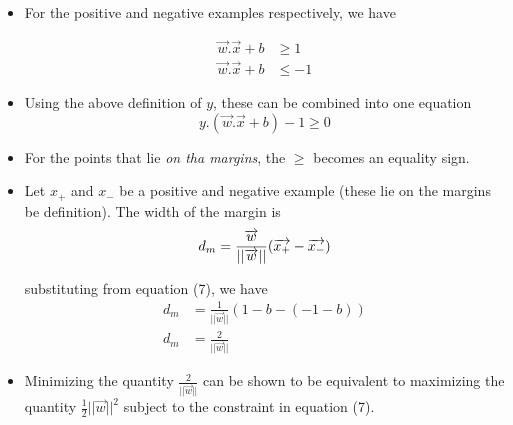 \documentclass{article}
\theoremstyle{plain}
\theoremstyle{definition}
\begin{document}
\begin{itemize}
    \item For the positive and negative examples respectively, we have
    
    \begin{align*}
        \overrightarrow{w}.\overrightarrow{x} + b &\ge 1 \\
        \overrightarrow{w}.\overrightarrow{x} + b &\le -1
    \end{align*}
    
    \item Using the above definition of $y$, these can be combined into one equation
    \begin{equation}
        y.(\overrightarrow{w}.\overrightarrow{x} + b) -1 \ge 0
    \end{equation}
    
    \item For the points that lie \textit{on tha margins}, the $\ge$ becomes an equality sign. 
    
    \item Let $x_+$ and $x_-$ be a positive and negative example (these lie on the margins be definition). The width of the margin is
    \begin{equation*}
        d_m = \frac{\overrightarrow{w}}{||\overrightarrow{w}||} (\overrightarrow{x_+} - \overrightarrow{x_-})\\
    \end{equation*}
    
    substituting from equation (7), we have
    \begin{align*}
        d_m &= \frac{1}{||\overrightarrow{w}||} (1 - b - (-1-b))\\
        d_m &= \frac{2}{||\overrightarrow{w}||}
    \end{align*}
    
    \item Minimizing the quantity $\frac{2}{||\overrightarrow{w}||}$ can be shown to be equivalent to maximizing the quantity $\frac{1}{2}  ||\overrightarrow{w}||^2$ subject to the constraint in equation (7). 
\end{itemize}
\end{document}
